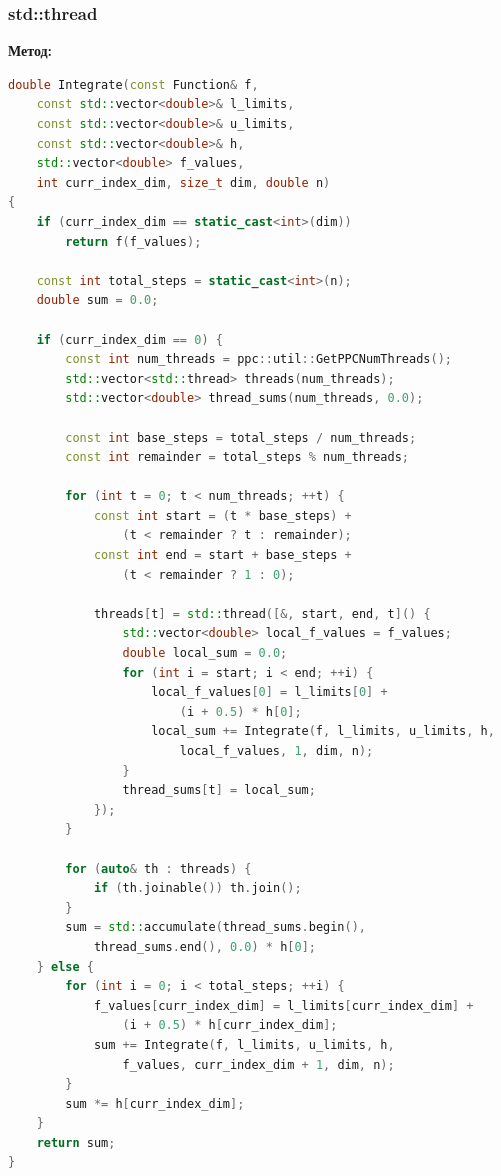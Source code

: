 \documentclass[14pt,a4paper]{article}
\begin{document}
\subsubsection{std::thread}
\textbf{Метод:}

\begin{framed}
\begin{lstlisting}[language=C++]
double Integrate(const Function& f,
    const std::vector<double>& l_limits,
    const std::vector<double>& u_limits,
    const std::vector<double>& h,
    std::vector<double> f_values,
    int curr_index_dim, size_t dim, double n)
{
    if (curr_index_dim == static_cast<int>(dim))
        return f(f_values);

    const int total_steps = static_cast<int>(n);
    double sum = 0.0;

    if (curr_index_dim == 0) {
        const int num_threads = ppc::util::GetPPCNumThreads();
        std::vector<std::thread> threads(num_threads);
        std::vector<double> thread_sums(num_threads, 0.0);

        const int base_steps = total_steps / num_threads;
        const int remainder = total_steps % num_threads;

        for (int t = 0; t < num_threads; ++t) {
            const int start = (t * base_steps) + 
                (t < remainder ? t : remainder);
            const int end = start + base_steps + 
                (t < remainder ? 1 : 0);

            threads[t] = std::thread([&, start, end, t]() {
                std::vector<double> local_f_values = f_values;
                double local_sum = 0.0;
                for (int i = start; i < end; ++i) {
                    local_f_values[0] = l_limits[0] + 
                        (i + 0.5) * h[0];
                    local_sum += Integrate(f, l_limits, u_limits, h,
                        local_f_values, 1, dim, n);
                }
                thread_sums[t] = local_sum;
            });
        }

        for (auto& th : threads) {
            if (th.joinable()) th.join();
        }
        sum = std::accumulate(thread_sums.begin(), 
            thread_sums.end(), 0.0) * h[0];
    } else {
        for (int i = 0; i < total_steps; ++i) {
            f_values[curr_index_dim] = l_limits[curr_index_dim] + 
                (i + 0.5) * h[curr_index_dim];
            sum += Integrate(f, l_limits, u_limits, h,
                f_values, curr_index_dim + 1, dim, n);
        }
        sum *= h[curr_index_dim];
    }
    return sum;
}
\end{lstlisting}
\end{framed}
\end{document}
